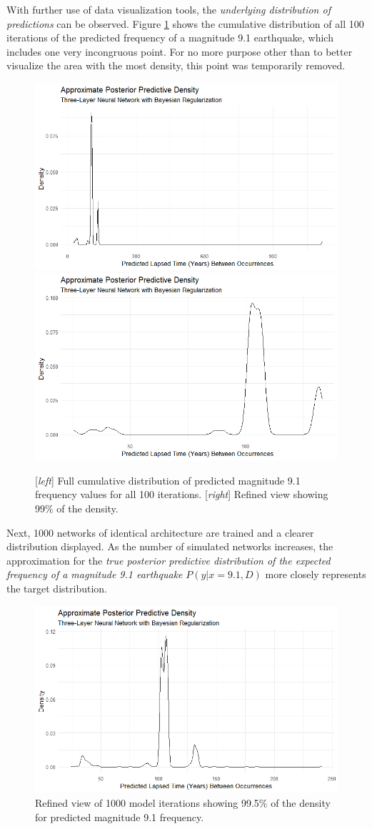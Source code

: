 With further use of data visualization tools, the \textit{underlying distribution of predictions} can be observed.  Figure \ref{tohoku_ppd_100} shows the cumulative distribution of all 100 iterations of the predicted frequency of a magnitude 9.1 earthquake, which includes one very incongruous point.  For no more purpose other than to better visualize the area with the most density, this point was temporarily removed.

\begin{figure}[H]
    \includegraphics[width=0.5\linewidth]{Figures/tohoku_ppd_full.png}
    \includegraphics[width=0.5\linewidth]{Figures/tohoku_ppd_99obs.png}
    \caption{\footnotesize{[\textit{left}] Full cumulative distribution of predicted magnitude 9.1 frequency values for all 100 iterations. [\textit{right}] Refined view showing 99\% of the density.}}
    \label{tohoku_ppd_100}
\end{figure}

Next, 1000 networks of identical architecture are trained and a clearer distribution displayed.  As the number of simulated networks increases, the approximation for the \textit{true posterior predictive distribution of the expected frequency of a magnitude 9.1 earthquake}
$P(y|x=9.1,D)$
more closely represents the target distribution.


\begin{figure}[H]
    \center
    \includegraphics[width=0.8\linewidth]{Figures/tohoku_ppd_995.png}
   \caption{\footnotesize{Refined view of 1000 model iterations showing 99.5\% of the density for predicted magnitude 9.1 frequency. }}
    \label{tohoku_ppd_1000}
\end{figure}